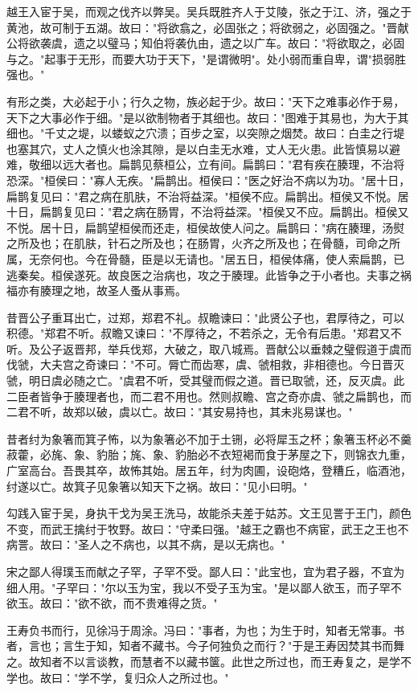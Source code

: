 \documentclass[]{article}
\begin{document}
越王入宦于吴，而观之伐齐以弊吴。吴兵既胜齐人于艾陵，张之于江、济，强之于黄池，故可制于五湖。故曰："将欲翕之，必固张之；将欲弱之，必固强之。"晋献公将欲袭虞，遗之以璧马；知伯将袭仇由，遗之以广车。故曰："将欲取之，必固与之。"起事于无形，而要大功于天下，"是谓微明"。处小弱而重自卑，谓"损弱胜强也。"

有形之类，大必起于小；行久之物，族必起于少。故曰："天下之难事必作于易，天下之大事必作于细。"是以欲制物者于其细也。故曰："图难于其易也，为大于其细也。"千丈之堤，以蝼蚁之穴溃；百步之室，以突隙之烟焚。故曰：白圭之行堤也塞其穴，丈人之慎火也涂其隙，是以白圭无水难，丈人无火患。此皆慎易以避难，敬细以远大者也。扁鹊见蔡桓公，立有间。扁鹊曰："君有疾在腠理，不治将恐深。"桓侯曰："寡人无疾。"扁鹊出。桓侯曰："医之好治不病以为功。"居十日，扁鹊复见曰："君之病在肌肤，不治将益深。"桓侯不应。扁鹊出。桓侯又不悦。居十日，扁鹊复见曰："君之病在肠胃，不治将益深。"桓侯又不应。扁鹊出。桓侯又不悦。居十日，扁鹊望桓侯而还走，桓侯故使人问之。扁鹊曰："病在腠理，汤熨之所及也；在肌肤，针石之所及也；在肠胃，火齐之所及也；在骨髓，司命之所属，无奈何也。今在骨髓，臣是以无请也。"居五日，桓侯体痛，使人索扁鹊，已逃秦矣。桓侯遂死。故良医之治病也，攻之于腠理。此皆争之于小者也。夫事之祸福亦有腠理之地，故圣人蚤从事焉。

昔晋公子重耳出亡，过郑，郑君不礼。叔瞻谏曰："此贤公子也，君厚待之，可以积德。"郑君不听。叔瞻又谏曰："不厚待之，不若杀之，无令有后患。"郑君又不听。及公子返晋邦，举兵伐郑，大破之，取八城焉。晋献公以垂棘之璧假道于虞而伐虢，大夫宫之奇谏曰："不可。脣亡而齿寒，虞、虢相救，非相德也。今日晋灭虢，明日虞必随之亡。"虞君不听，受其璧而假之道。晋已取虢，还，反灭虞。此二臣者皆争于腠理者也，而二君不用也。然则叔瞻、宫之奇亦虞、虢之扁鹊也，而二君不听，故郑以破，虞以亡。故曰："其安易持也，其未兆易谋也。"

昔者纣为象箸而箕子怖，以为象箸必不加于土铏，必将犀玉之杯；象箸玉杯必不羹菽藿，必旄、象、豹胎；旄、象、豹胎必不衣短褐而食于茅屋之下，则锦衣九重，广室高台。吾畏其卒，故怖其始。居五年，纣为肉圃，设砲烙，登糟丘，临酒池，纣遂以亡。故箕子见象箸以知天下之祸。故曰："见小曰明。"

勾践入宦于吴，身执干戈为吴王洗马，故能杀夫差于姑苏。文王见詈于王门，颜色不变，而武王擒纣于牧野。故曰："守柔曰强。"越王之霸也不病宦，武王之王也不病詈。故曰："圣人之不病也，以其不病，是以无病也。"

宋之鄙人得璞玉而献之子罕，子罕不受。鄙人曰："此宝也，宜为君子器，不宜为细人用。"子罕曰："尔以玉为宝，我以不受子玉为宝。"是以鄙人欲玉，而子罕不欲玉。故曰："欲不欲，而不贵难得之货。"

王寿负书而行，见徐冯于周涂。冯曰："事者，为也；为生于时，知者无常事。书者，言也；言生于知，知者不藏书。今子何独负之而行？"于是王寿因焚其书而舞之。故知者不以言谈教，而慧者不以藏书箧。此世之所过也，而王寿复之，是学不学也。故曰："学不学，复归众人之所过也。"
\end{document}
